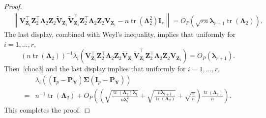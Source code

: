 \documentclass[12pt]{article} %
\DeclareMathOperator{\mytr}{tr}
\newcommand{\bZ}{\mathbf{Z}}
\newcommand{\bP}{\mathbf{P}}
\newcommand{\bY}{\mathbf{Y}}
\newcommand{\bI}{\mathbf{I}}
\newcommand{\bV}{\mathbf{V}}
\newcommand{\bfsym}[1]{\ensuremath{\boldsymbol{#1}}}
\def\blambda {\bfsym {\lambda}}
\def\bLambda {\bfsym {\Lambda}}
\def\bSigma {\bfsym {\Sigma}}
\theoremstyle{definition}
\begin{document}
\begin{appendices}
\begin{proof}
\begin{equation*}
        \begin{split}
            &\left\|
            \bV_{\bZ_1}^\top \bZ_2^\top \bLambda_2\bZ_{2} \tilde{\bV}_{\bZ_1}
            \tilde{\bV}_{\bZ_1}^\top \bZ_2^\top \bLambda_2 \bZ_2 \bV_{\bZ_1}
            -
            n\mytr(\bLambda_2^2)
            \bI_r
            \right\|
            =
            O_P\left(
                \sqrt{rn}\blambda_{r+1}\mytr(\bLambda_2)
        \right)
        .
        \end{split}
    \end{equation*}
    The last display, combined with Weyl's inequality, implies that uniformly for $i=1,\ldots, r$,
    \begin{equation*}
        (n\mytr(\bLambda_2))^{-1}\lambda_i\left(
            \bV_{\bZ_1}^\top \bZ_2^\top \bLambda_2\bZ_{2} \tilde{\bV}_{\bZ_1}
            \tilde{\bV}_{\bZ_1}^\top \bZ_2^\top \bLambda_2 \bZ_2 \bV_{\bZ_1}
        \right)
        =
        O_P(\blambda_{r+1})
        .
    \end{equation*}
    Then~\eqref{choc3} and the last display implies that uniformly for $i=1,\ldots,r$,
\begin{equation*}
    \begin{split}
    &\lambda_i\left(
             (\bI_p -\bP_\bY)\bSigma (\bI_p- \bP_{\bY})
         \right)
         \\
             =&
             n^{-1}\mytr(\bLambda_2)
             +O_P\left(
                 \left(
                     \sqrt{\frac{\mytr(\bLambda_2)\blambda_1}{n\blambda_r^2}}  
                     +\sqrt{\frac{n\blambda_{r+1}}{\mytr(\bLambda_2)}}
                     +\sqrt{\frac{r}{n}}
                 \right)
             \frac{\mytr(\bLambda_2)}{n}\right).
    \end{split}
\end{equation*}
This completes the proof.

\end{proof}


\end{appendices}
\end{document}
